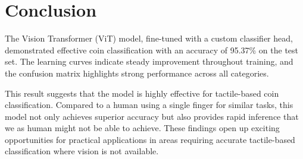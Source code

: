 \documentclass[a4paper,12pt]{article}
\begin{document}
\section*{Conclusion}
The Vision Transformer (ViT) model, fine-tuned with a custom classifier head, demonstrated effective coin classification with an accuracy of 95.37\% on the test set. The learning curves indicate steady improvement throughout training, and the confusion matrix highlights strong performance across all categories. 

This result suggests that the model is highly effective for tactile-based coin classification. Compared to a human using a single finger for similar tasks, this model not only achieves superior accuracy but also provides rapid inference that we as human might not be able to achieve. These findings open up exciting opportunities for practical applications in areas requiring accurate tactile-based classification where vision is not available.
\end{document}
